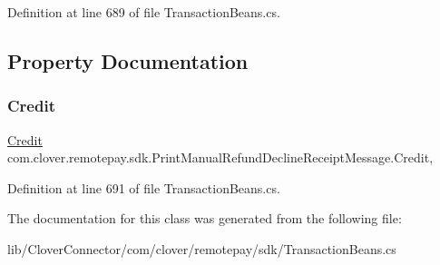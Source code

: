 Definition at line 689 of file Transaction\+Beans.\+cs.



\subsection{Property Documentation}
\mbox{\label{classcom_1_1clover_1_1remotepay_1_1sdk_1_1_print_manual_refund_decline_receipt_message_a4122dfe89edab079126b51c3b23c9568}} 
\subsubsection{\texorpdfstring{Credit}{Credit}}
{\footnotesize\ttfamily \hyperlink{classcom_1_1clover_1_1sdk_1_1v3_1_1payments_1_1_credit}{Credit} com.\+clover.\+remotepay.\+sdk.\+Print\+Manual\+Refund\+Decline\+Receipt\+Message.\+Credit\hspace{0.3cm}{\ttfamily [get]}, {\ttfamily [set]}}



Definition at line 691 of file Transaction\+Beans.\+cs.



The documentation for this class was generated from the following file\+:\begin{DoxyCompactItemize}
\item 
lib/\+Clover\+Connector/com/clover/remotepay/sdk/Transaction\+Beans.\+cs\end{DoxyCompactItemize}
